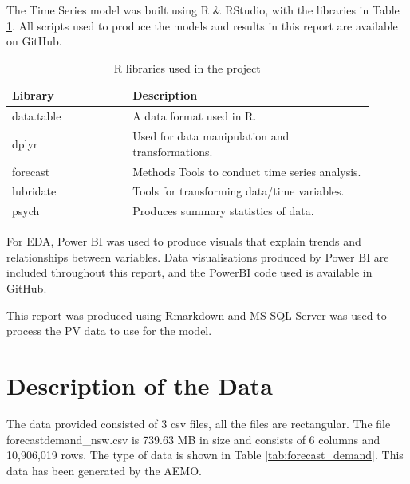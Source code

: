 \documentclass[mstat,12pt]{unswthesis}
\begin{document}
The Time Series model was built using R \&
RStudio\cite{rcoreteam_2017_r}, with the libraries in Table
\ref{tab:Rmodel}. All scripts used to produce the models and results in
this report are available on GitHub.

\begin{table}[H]
\centering
\begin{tabular}{p{0.3\linewidth} | p{0.6\linewidth}} 
\hline\hline
\textbf{Library}      & \textbf{Description}                                                                                                                         \\ 
\hline\hline
data.table & A data format used in R.                         \\
dplyr      & Used for data manipulation and transformations.  \\
forecast   & Methods  Tools to conduct time series analysis.  \\
lubridate  & Tools for transforming data/time variables.      \\
psych      & Produces summary statistics of data.            \\

\hline\hline
\end{tabular}
\caption{R libraries used in the project}
\label{tab:Rmodel}
\end{table}

For EDA, Power BI was used to produce visuals that explain trends and
relationships between variables. Data visualisations produced by Power
BI are included throughout this report, and the PowerBI code used is
available in GitHub.

This report was produced using Rmarkdown and MS SQL Server was used to
process the PV data to use for the model\cite{yihuixie_2018_r}.

\hypertarget{description-of-the-data}{%
\section{Description of the Data}\label{description-of-the-data}}

The data provided consisted of 3 csv files, all the files are
rectangular. The file forecastdemand\_nsw.csv is 739.63 MB in size and
consists of 6 columns and 10,906,019 rows. The type of data is shown in
Table \ref{tab:forecast_demand}. This data has been generated by the
AEMO\cite{aemo_electicity}.
\end{document}
